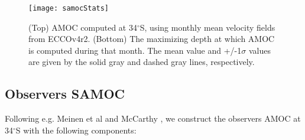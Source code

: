 \documentclass[a4paper,11pt]{article}
\newcommand{\degSym}{$^{\circ}$}
\begin{document}
   \begin{figure}
    \centering
    \texttt{[image: samocStats]}
    \caption{(Top) AMOC computed at 34\degSym S, using monthly mean velocity fields from ECCOv4r2. (Bottom) The maximizing depth at which AMOC is computed during that month. The mean value and +/-1$\sigma$ values are given by the solid gray and dashed gray lines, respectively.}
    \label{fig:samocStats}
   \end{figure}


  

   \subsection{Observers SAMOC}
    \label{obsSAMOC}
    
    Following e.g. Meinen et al \cite{meinenSamoc} and McCarthy \cite{mcCarthy}, we construct the observers AMOC at 34\degSym S with the following components: 
    
\end{document}
